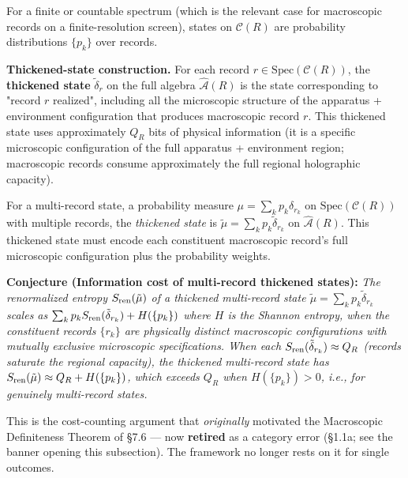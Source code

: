 \documentclass[11pt,a4paper]{article}
\begin{document}
For a finite or countable spectrum (which is the relevant case for macroscopic records on a finite-resolution screen), states on $\mathcal{C}(R)$ are probability distributions $\{p_k\}$ over records.

\textbf{Thickened-state construction.} For each record $r \in \mathrm{Spec}(\mathcal{C}(R))$, the \textbf{thickened state} $\tilde{\delta}_r$ on the full algebra $\hat{\mathcal{A}}(R)$ is the state corresponding to "record $r$ realized", including all the microscopic structure of the apparatus + environment configuration that produces macroscopic record $r$. This thickened state uses approximately $Q_R$ bits of physical information (it is a specific microscopic configuration of the full apparatus + environment region; macroscopic records consume approximately the full regional holographic capacity).

For a multi-record state, a probability measure $\mu = \sum_k p_k \delta_{r_k}$ on $\mathrm{Spec}(\mathcal{C}(R))$ with multiple records, the \emph{thickened state} is $\tilde{\mu} = \sum_k p_k \tilde{\delta}_{r_k}$ on $\hat{\mathcal{A}}(R)$. This thickened state must encode each constituent macroscopic record's full microscopic configuration plus the probability weights.

\textbf{Conjecture (Information cost of multi-record thickened states):} \emph{The renormalized entropy $S_{\rm ren}(\tilde{\mu})$ of a thickened multi-record state $\tilde{\mu} = \sum_k p_k \tilde{\delta}_{r_k}$ scales as $\sum_k p_k S_{\rm ren}(\tilde{\delta}_{r_k}) + H(\{p_k\})$ where $H$ is the Shannon entropy, when the constituent records $\{r_k\}$ are physically distinct macroscopic configurations with mutually exclusive microscopic specifications. When each $S_{\rm ren}(\tilde{\delta}_{r_k}) \approx Q_R$ (records saturate the regional capacity), the thickened multi-record state has $S_{\rm ren}(\tilde{\mu}) \approx Q_R + H(\{p_k\})$, which exceeds $Q_R$ when $H(\{p_k\}) > 0$, i.e., for genuinely multi-record states.}

This is the cost-counting argument that \emph{originally} motivated the Macroscopic Definiteness Theorem of §7.6 — now \textbf{retired} as a category error (§1.1a; see the banner opening this subsection). The framework no longer rests on it for single outcomes.
\end{document}
